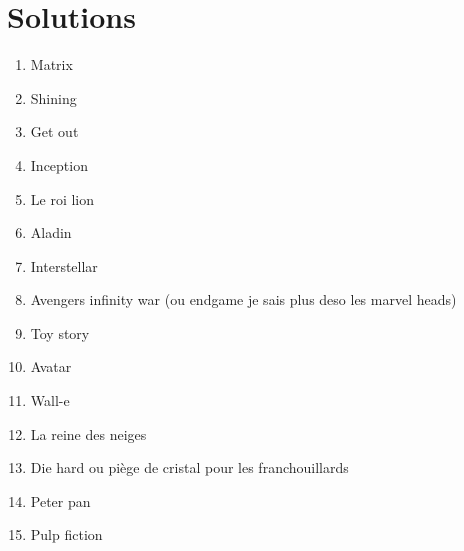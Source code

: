 \hypertarget{solutions}{%
\section{Solutions}\label{solutions}}

\begin{enumerate}
\def\labelenumi{\arabic{enumi}.}
\tightlist
\item
  Matrix
\item
  Shining
\item
  Get out
\item
  Inception
\item
  Le roi lion
\item
  Aladin
\item
  Interstellar
\item
  Avengers infinity war (ou endgame je sais plus deso les marvel heads)
\item
  Toy story
\item
  Avatar
\item
  Wall-e
\item
  La reine des neiges
\item
  Die hard ou piège de cristal pour les franchouillards
\item
  Peter pan
\item
  Pulp fiction
\end{enumerate}

